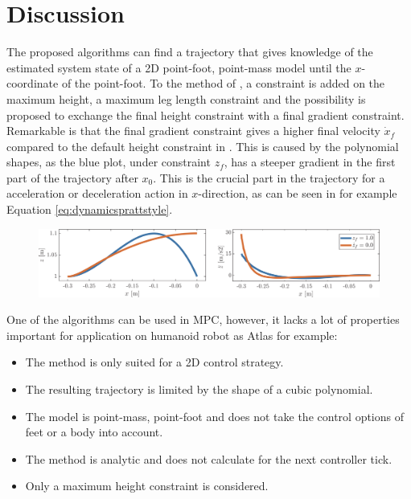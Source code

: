 \section{Discussion}
The proposed algorithms can find a trajectory that gives knowledge of the estimated system state of a \ac{2D} point-foot, point-mass model until the $x$-coordinate of the point-foot. To the method of \cite{koolen2016balance}, a constraint is added on the maximum height, a maximum leg length constraint and the possibility is proposed to exchange the final height constraint with a final gradient constraint. Remarkable is that the final gradient constraint gives a higher final velocity $\dot{x}_f$ compared to the default height constraint in . This is caused by the polynomial shapes, as the blue plot, under constraint $z_f$, has a steeper gradient in the first part of the trajectory after $x_0$. This is the crucial part in the trajectory for a acceleration or deceleration action in $x$-direction, as can be seen in for example Equation \eqref{eq:dynamicsprattstyle}. \\
\begin{figure}[h]
\centering
\includegraphics[width=\textwidth]{STYLESTUFF/polynomialforce.png}
\caption{ }
\label{fig:polforce}
\end{figure}
One of the algorithms can be used in \ac{MPC}, however, it lacks a lot of properties important for application on humanoid robot as Atlas for example:
\begin{itemize}
	\item The method is only suited for a \ac{2D} control strategy.
	\item The resulting trajectory is limited by the shape of a cubic polynomial.
	\item The model is point-mass, point-foot and does not take the control options of feet or a body into account.
	\item The method is analytic and does not calculate for the next controller tick.
	\item Only a maximum height constraint is considered.
\end{itemize}

